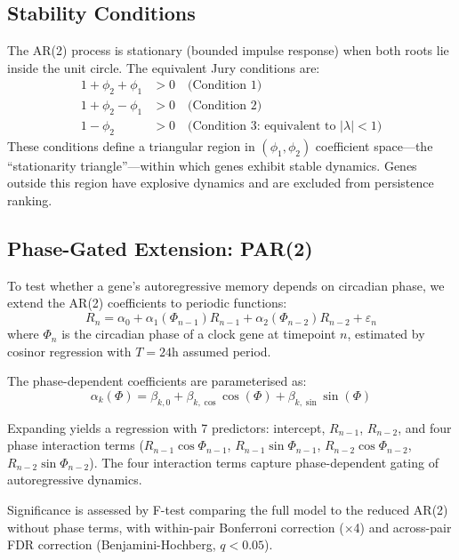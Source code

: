 \documentclass[11pt,letterpaper]{article}
\begin{document}
\subsection{Stability Conditions}

The AR(2) process is stationary (bounded impulse response) when both roots lie inside the unit circle. The equivalent Jury conditions are:
\begin{align}
1 + \phi_2 + \phi_1 &> 0 \quad \text{(Condition 1)} \\
1 + \phi_2 - \phi_1 &> 0 \quad \text{(Condition 2)} \\
1 - \phi_2 &> 0 \quad \text{(Condition 3: equivalent to } |\lambda| < 1\text{)}
\end{align}
These conditions define a triangular region in $(\phi_1, \phi_2)$ coefficient space---the ``stationarity triangle''---within which genes exhibit stable dynamics. Genes outside this region have explosive dynamics and are excluded from persistence ranking.

\subsection{Phase-Gated Extension: PAR(2)}

To test whether a gene's autoregressive memory depends on circadian phase, we extend the AR(2) coefficients to periodic functions:
\begin{equation}
R_n = \alpha_0 + \alpha_1(\Phi_{n-1})R_{n-1} + \alpha_2(\Phi_{n-2})R_{n-2} + \varepsilon_n
\end{equation}
where $\Phi_n$ is the circadian phase of a clock gene at timepoint $n$, estimated by cosinor regression with $T = 24$h assumed period.

The phase-dependent coefficients are parameterised as:
\begin{equation}
\alpha_k(\Phi) = \beta_{k,0} + \beta_{k,\cos}\cos(\Phi) + \beta_{k,\sin}\sin(\Phi)
\end{equation}

Expanding yields a regression with 7 predictors: intercept, $R_{n-1}$, $R_{n-2}$, and four phase interaction terms ($R_{n-1}\cos\Phi_{n-1}$, $R_{n-1}\sin\Phi_{n-1}$, $R_{n-2}\cos\Phi_{n-2}$, $R_{n-2}\sin\Phi_{n-2}$). The four interaction terms capture phase-dependent gating of autoregressive dynamics.

Significance is assessed by F-test comparing the full model to the reduced AR(2) without phase terms, with within-pair Bonferroni correction ($\times$4) and across-pair FDR correction (Benjamini-Hochberg, $q < 0.05$).
\end{document}
